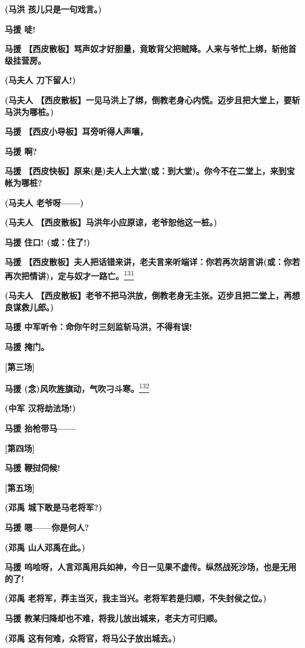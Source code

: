 \textbf{(马洪 孩儿只是一句戏言。)}

\textbf{马援 唗!}

\textbf{马援
【西皮散板】骂声奴才好胆量，竟敢背父把贼降。人来与爷忙上绑，斩他首级挂营房。}

\textbf{(马夫人 刀下留人!)}

\textbf{(马夫人
【西皮散板】一见马洪上了绑，倒教老身心内慌。迈步且把大堂上，要斩马洪为哪桩。)}

\textbf{马援 【西皮小导板】耳旁听得人声嚷，}

\textbf{马援 啊?}

\textbf{马援
【西皮快板】原来(是)夫人上大堂(或：到大堂)。你今不在二堂上，来到宝帐为哪桩?}

\textbf{(马夫人 老爷呀------)}

\textbf{(马夫人 【西皮散板】马洪年小应原谅，老爷恕他这一桩。)}

\textbf{马援 住口! (或：住了!)}

\textbf{马援
【西皮散板】夫人把话错来讲，老夫言来听端详：你若再次胡言讲(或：你若再次把情讲)，定与奴才一路亡。}\protect\hyperlink{fn131}{\textsuperscript{131}}

\textbf{(马夫人
【西皮散板】老爷不把马洪放，倒教老身无主张。迈步且把二堂上，再想良谋救儿郎。)}

\textbf{马援 中军听令：命你午时三刻监斩马洪，不得有误!}

\textbf{马援 掩门。}

\textbf{{[}第三场{]}}

\textbf{马援
(念)风吹旌旗动，气吹刁斗寒。}\protect\hyperlink{fn132}{\textsuperscript{132}}

\textbf{(中军 汉将劫法场!)}

\textbf{马援 抬枪带马------}

\textbf{{[}第四场{]}}

\textbf{马援 鞭挝伺候!}

\textbf{{[}第五场{]}}

\textbf{(邓禹 城下敢是马老将军?)}

\textbf{马援 嗯------你是何人?}

\textbf{(邓禹 山人邓禹在此。)}

\textbf{马援
呜哙呀，人言邓禹用兵如神，今日一见果不虚传。纵然战死沙场，也是无用的了!}

\textbf{(邓禹
老将军，莽主当灭，我主当兴。老将军若是归顺，不失封侯之位。)}

\textbf{马援 教某归降却也不难，将我儿放出城来，老夫方可归顺。}

\textbf{(邓禹 这有何难，众将官，将马公子放出城去。)}

